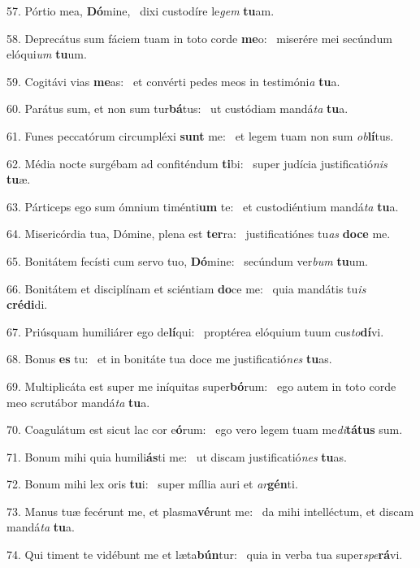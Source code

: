 57. Pórtio mea, \textbf{Dó}mine, \ast\  dixi custodíre le\textit{gem} \textbf{tu}am.\

58. Deprecátus sum fáciem tuam in toto corde \textbf{me}o: \ast\  miserére mei secúndum elóqui\textit{um} \textbf{tu}um.\

59. Cogitávi vias \textbf{me}as: \ast\  et convérti pedes meos in testimóni\textit{a} \textbf{tu}a.\

60. Parátus sum, et non sum tur\textbf{bá}tus: \ast\  ut custódiam mandá\textit{ta} \textbf{tu}a.\

61. Funes peccatórum circumpléxi \textbf{sunt} me: \ast\  et legem tuam non sum \textit{ob}\textbf{lí}tus.\

62. Média nocte surgébam ad confiténdum \textbf{ti}bi: \ast\  super judícia justificatió\textit{nis} \textbf{tu}æ.\

63. Párticeps ego sum ómnium timénti\textbf{um} te: \ast\  et custodiéntium mandá\textit{ta} \textbf{tu}a.\

64. Misericórdia tua, Dómine, plena est \textbf{ter}ra: \ast\  justificatiónes tu\textit{as} \textbf{do}\textbf{ce} me.\

65. Bonitátem fecísti cum servo tuo, \textbf{Dó}mine: \ast\  secúndum ver\textit{bum} \textbf{tu}um.\

66. Bonitátem et disciplínam et sciéntiam \textbf{do}ce me: \ast\  quia mandátis tu\textit{is} \textbf{cré}\textbf{di}di.\

67. Priúsquam humiliárer ego de\textbf{lí}qui: \ast\  proptérea elóquium tuum cus\textit{to}\textbf{dí}vi.\

68. Bonus \textbf{es} tu: \ast\  et in bonitáte tua doce me justificatió\textit{nes} \textbf{tu}as.\

69. Multiplicáta est super me iníquitas super\textbf{bó}rum: \ast\  ego autem in toto corde meo scrutábor mandá\textit{ta} \textbf{tu}a.\

70. Coagulátum est sicut lac cor e\textbf{ó}rum: \ast\  ego vero legem tuam me\textit{di}\textbf{tá}\textbf{tus} sum.\

71. Bonum mihi quia humili\textbf{ás}ti me: \ast\  ut discam justificatió\textit{nes} \textbf{tu}as.\

72. Bonum mihi lex oris \textbf{tu}i: \ast\  super míllia auri et \textit{ar}\textbf{gén}ti.\

73. Manus tuæ fecérunt me, et plasma\textbf{vé}runt me: \ast\  da mihi intelléctum, et discam mandá\textit{ta} \textbf{tu}a.\

74. Qui timent te vidébunt me et læta\textbf{bún}tur: \ast\  quia in verba tua super\textit{spe}\textbf{rá}vi.\

